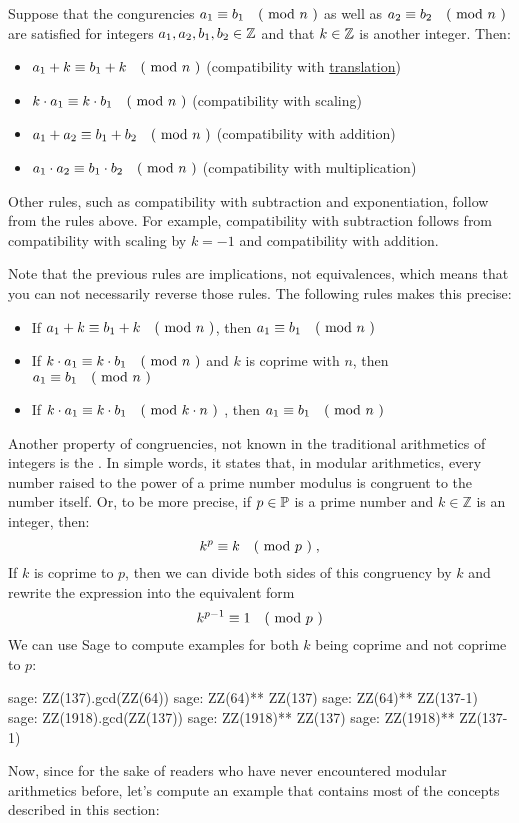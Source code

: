 Suppose that the congurencies $a_1 \equiv b_1 \quad \text{( mod } n \text{ )}$ as well as $a_2 \equiv b_2 \quad \text{( mod } n \text{ )}$ are satisfied for integers $a_1,a_2,b_1,b_2\in\mathbb{Z}$ and that $k\in\mathbb{Z}$ is another integer. Then:
\begin{itemize}
\item $a_1+k \equiv b_1+k \quad \text{( mod } n \text{ )}$ (compatibility with \href{https://en.wikipedia.org/wiki/Translation_(geometry)}{translation})
\item $k\cdot a_1 \equiv k\cdot b_1 \quad \text{( mod } n \text{ )}$ (compatibility with scaling)
\item $a_1+a_2 \equiv b_1+b_2 \quad \text{( mod } n \text{ )}$ (compatibility with addition)
\item $a_1\cdot a_2 \equiv b_1\cdot b_2 \quad \text{( mod } n \text{ )}$ (compatibility with multiplication)
\end{itemize}
Other rules, such as compatibility with subtraction and exponentiation, follow from the rules above. For example, compatibility with subtraction follows from compatibility with scaling by $k=-1$ and compatibility with addition.

Note that the previous rules are implications, not equivalences, which means that you can not necessarily reverse those rules. The following rules makes this precise:
\begin{itemize}
\item If $a_1+k \equiv b_1+k \quad \text{( mod } n \text{ )}$, then $a_1 \equiv b_1 \quad \text{( mod } n \text{ )}$
\item If $k\cdot a_1 \equiv k\cdot b_1 \quad \text{( mod } n \text{ )}$ and $k$ is coprime with $n$, then $a_1 \equiv b_1 \quad \text{( mod } n \text{ )}$
\item If $k\cdot a_1 \equiv k\cdot b_1 \quad \text{( mod } k\cdot n \text{ )}$ , then $a_1 \equiv b_1 \quad \text{( mod } n \text{ )}$
\end{itemize}
Another property of congruencies, not known in the traditional arithmetics of integers is the  . In simple words, it states that, in modular arithmetics, every number raised to the power of a prime number modulus is congruent to the number itself. Or, to be more precise, if $ p \in \mathbb{P} $ is a prime number and $ k \in \mathbb{Z} $ is an integer, then:
\begin{equation}
k ^ p \equiv k \quad \text{( mod } p \text{ )} \;,
\end{equation}
If $k$ is coprime to $p$, then we can divide both sides of this congruency by $k$ and rewrite the expression into the equivalent form 
\begin{equation}
\label{eq_fermat_lt_2}
k ^{p-1} \equiv 1 \quad \text{( mod } p \text{ )}
\end{equation} 
We can use Sage to compute examples for both $k$ being coprime and not coprime to $p$:
\begin{sagecommandline}
sage: ZZ(137).gcd(ZZ(64))
sage: ZZ(64)** ZZ(137) %
sage: ZZ(64)** ZZ(137-1) %
sage: ZZ(1918).gcd(ZZ(137))
sage: ZZ(1918)** ZZ(137) %
sage: ZZ(1918)** ZZ(137-1) %
\end{sagecommandline}
Now, since for the sake of readers who have never encountered modular arithmetics before, let's compute an example that contains most of the concepts described in this section:   
   
